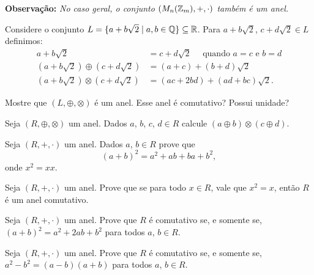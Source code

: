 \documentclass[12pt]{exam}
\begin{document}
    \vspace{.2cm}

    \textbf{Observação: }\textit{No caso geral, o conjunto $(M_n(\mathbb{Z}_m), + , \cdot)$ também é um anel.}

    \vspace{.3cm}

    \questao{} Considere o conjunto $L = \{ a + b\sqrt{2} \mid a, b \in \mathbb{Q}\} \subseteq \mathbb{R}$. Para $a + b\sqrt{2}$, $c + d\sqrt{2} \in L$ definimos:
    \begin{align*}
        a + b\sqrt{2} &= c + d\sqrt{2} \quad \mbox{ quando } a = c \mbox{ e } b = d\\
        (a + b\sqrt{2}) \oplus (c + d\sqrt{2}) &= (a + c) + (b + d)\sqrt{2}\\
        (a + b\sqrt{2}) \otimes (c + d\sqrt{2}) &= (ac + 2bd) + (ad + bc)\sqrt{2}.
    \end{align*}

    Mostre que $(L, \oplus, \otimes)$ \'e um anel. Esse anel \'e comutativo? Possui unidade?

    \vspace{.3cm}

    \questao{} Seja $(R, \oplus, \otimes)$ um anel. Dados $a$, $b$, $c$, $d \in R$ calcule $(a \oplus b)\otimes (c \oplus d)$.

    \vspace{.3cm}

    \questao{} Seja $(R, +, \cdot)$ um anel. Dados $a$, $b \in R$ prove que
    \[
        (a + b)^2 = a^2 + ab + ba + b^2,
    \]
    onde $x^2 = xx$.

    \vspace{.3cm}

    \questao{} Seja $(R, +, \cdot)$ um anel. Prove que se para todo $x \in R$, vale que $x^2 = x$, então $R$ é um anel comutativo.

    \vspace{.3cm}

    \questao{} Seja $(R, +, \cdot)$ um anel. Prove que $R$ é comutativo se, e somente se, $(a + b)^2 = a^2 + 2ab + b^2$ para todos $a$, $b \in R$.

    \vspace{.3cm}

    \questao{} Seja $(R, +, \cdot)$ um anel. Prove que $R$ é comutativo se, e somente se, $a^2 - b^2 = (a - b)(a + b)$ para todos $a$, $b \in R$.

    \vspace{.3cm}
\end{document}
